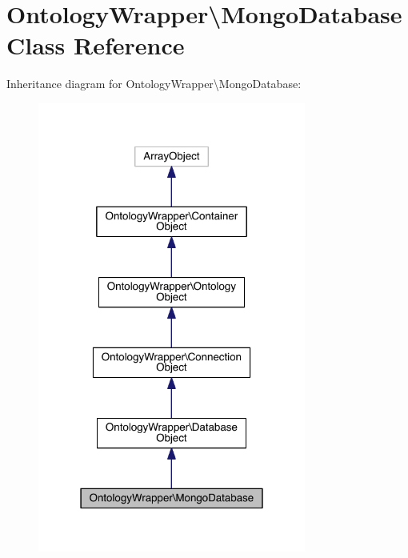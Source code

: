 \hypertarget{class_ontology_wrapper_1_1_mongo_database}{\section{Ontology\-Wrapper\textbackslash{}Mongo\-Database Class Reference}
\label{class_ontology_wrapper_1_1_mongo_database}
}


Inheritance diagram for Ontology\-Wrapper\textbackslash{}Mongo\-Database\-:
\nopagebreak
\begin{figure}[H]
\begin{center}
\leavevmode
\includegraphics[width=250pt]{class_ontology_wrapper_1_1_mongo_database__inherit__graph}
\end{center}
\end{figure}


